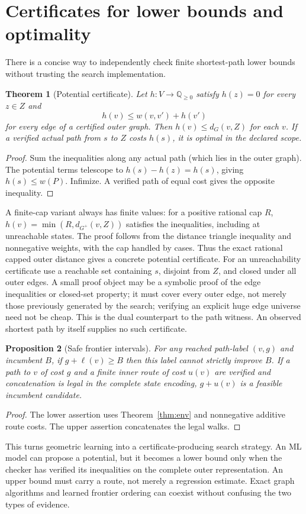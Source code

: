 \documentclass[11pt]{article}
\newtheorem{theorem}{Theorem}[section]\newtheorem{proposition}[theorem]{Proposition}\newtheorem{lemma}[theorem]{Lemma}\newtheorem{corollary}[theorem]{Corollary}
\theoremstyle{definition}\newtheorem{definition}[theorem]{Definition}\newtheorem{example}[theorem]{Example}\newtheorem{conjecture}[theorem]{Conjecture}
\newcommand{\Q}{\mathbb Q}\newcommand{\N}{\mathbb N}\newcommand{\R}{\mathbb R}\newcommand{\E}{\mathbb E}\newcommand{\Prb}{\mathbb P}\newcommand{\Dep}{\operatorname{Dep}}\newcommand{\Ind}{\operatorname{Ind}}\newcommand{\Vfy}{\operatorname{Verify}}\newcommand{\supp}{\operatorname{supp}}\newcommand{\Fix}{\operatorname{Fix}}\newcommand{\eps}{\varepsilon}
\begin{document}
\section{Certificates for lower bounds and optimality}
There is a concise way to independently check finite shortest-path lower bounds without trusting the search implementation.
\begin{theorem}[Potential certificate]\label{thm:potential}
Let $h:V\to\Q_{\ge0}$ satisfy $h(z)=0$ for every $z\in Z$ and
\[h(v)\le w(v,v')+h(v')\]
for every edge of a certified outer graph. Then $h(v)\le d_G(v,Z)$ for each $v$. If a verified actual path from $s$ to $Z$ costs $h(s)$, it is optimal in the declared scope.
\end{theorem}
\begin{proof} Sum the inequalities along any actual path (which lies in the outer graph). The potential terms telescope to $h(s)-h(z)=h(s)$, giving $h(s)\le w(P)$. Infimize. A verified path of equal cost gives the opposite inequality.\end{proof}
A finite-cap variant always has finite values: for a positive rational cap $R$, $h(v)=\min(R,d_{G^+}(v,Z))$ satisfies the inequalities, including at unreachable states. The proof follows from the distance triangle inequality and nonnegative weights, with the cap handled by cases. Thus the exact rational capped outer distance gives a concrete potential certificate. For an unreachability certificate use a reachable set containing $s$, disjoint from $Z$, and closed under all outer edges. A small proof object may be a symbolic proof of the edge inequalities or closed-set property; it must cover every outer edge, not merely those previously generated by the search; verifying an explicit huge edge universe need not be cheap. This is the dual counterpart to the path witness. An observed shortest path by itself supplies no such certificate.
\begin{proposition}[Safe frontier intervals]
For any reached path-label $(v,g)$ and incumbent $B$, if $g+\ell(v)\ge B$ then this label cannot strictly improve $B$. If a path to $v$ of cost $g$ and a finite inner route of cost $u(v)$ are verified and concatenation is legal in the complete state encoding, $g+u(v)$ is a feasible incumbent candidate.
\end{proposition}
\begin{proof} The lower assertion uses Theorem~\ref{thm:env} and nonnegative additive route costs. The upper assertion concatenates the legal walks.\end{proof}
This turns geometric learning into a certificate-producing search strategy. An ML model can propose a potential, but it becomes a lower bound only when the checker has verified its inequalities on the complete outer representation. An upper bound must carry a route, not merely a regression estimate. Exact graph algorithms and learned frontier ordering can coexist without confusing the two types of evidence.
\end{document}
